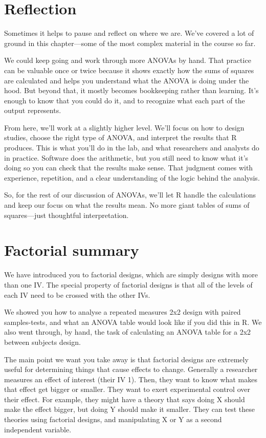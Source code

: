 \documentclass[
  letterpaper,
  DIV=11,
  numbers=noendperiod]{scrreprt}
\begin{document}
\section{Reflection}\label{reflection}

Sometimes it helps to pause and reflect on where we are. We've covered a
lot of ground in this chapter---some of the most complex material in the
course so far.

We could keep going and work through more ANOVAs by hand. That practice
can be valuable once or twice because it shows exactly how the sums of
squares are calculated and helps you understand what the ANOVA is doing
under the hood. But beyond that, it mostly becomes bookkeeping rather
than learning. It's enough to know that you could do it, and to
recognize what each part of the output represents.

From here, we'll work at a slightly higher level. We'll focus on how to
design studies, choose the right type of ANOVA, and interpret the
results that R produces. This is what you'll do in the lab, and what
researchers and analysts do in practice. Software does the arithmetic,
but you still need to know what it's doing so you can check that the
results make sense. That judgment comes with experience, repetition, and
a clear understanding of the logic behind the analysis.

So, for the rest of our discussion of ANOVAs, we'll let R handle the
calculations and keep our focus on what the results mean. No more giant
tables of sums of squares---just thoughtful interpretation.

\section{Factorial summary}\label{factorial-summary}

We have introduced you to factorial designs, which are simply designs
with more than one IV. The special property of factorial designs is that
all of the levels of each IV need to be crossed with the other IVs.

We showed you how to analyse a repeated measures 2x2 design with paired
samples-tests, and what an ANOVA table would look like if you did this
in R. We also went through, by hand, the task of calculating an ANOVA
table for a 2x2 between subjects design.

The main point we want you take away is that factorial designs are
extremely useful for determining things that cause effects to change.
Generally a researcher measures an effect of interest (their IV 1).
Then, they want to know what makes that effect get bigger or smaller.
They want to exert experimental control over their effect. For example,
they might have a theory that says doing X should make the effect
bigger, but doing Y should make it smaller. They can test these theories
using factorial designs, and manipulating X or Y as a second independent
variable.
\end{document}
